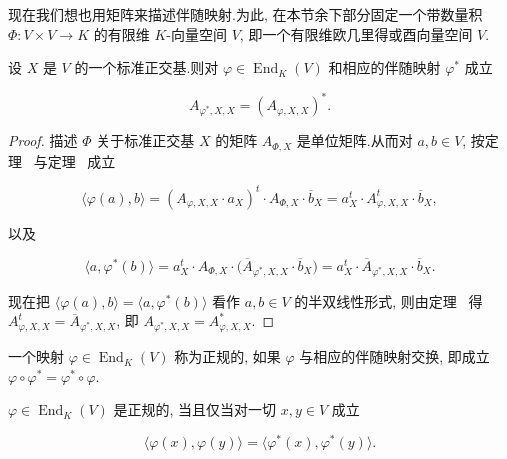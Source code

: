 现在我们想也用矩阵来描述伴随映射.为此, 在本节余下部分固定一个带数量积 $\varPhi \colon V \times V \longrightarrow K$ 的有限维 $K$-向量空间 $V$, 即一个有限维欧几里得或酉向量空间 $V$.

\begin{remark}\label{rem:7.4.4}
设 $X$ 是 $V$ 的一个标准正交基.则对 $\varphi \in \operatorname{End}_K(V)$ 和相应的伴随映射 $\varphi^*$ 成立

\[
A_{\varphi^*, X, X} = (A_{\varphi, X, X})^*\text{.}
\]
\end{remark}

\begin{proof}
描述 $\varPhi$ 关于标准正交基 $X$ 的矩阵 $A_{\varPhi, X}$ 是单位矩阵.从而对 $a, b \in V$, 按定理~ 与定理~ 成立

\[
\bigl\langle \varphi(a), b \bigr\rangle = (A_{\varphi, X, X} \cdot a_X)^t \cdot A_{\varPhi, X} \cdot \overline{b}_X = a_X^t \cdot A_{\varphi, X, X}^t \cdot \overline{b}_X,
\]

以及

\[
\bigl\langle a, \varphi^*(b) \bigr\rangle = a_X^t \cdot A_{\varPhi, X} \cdot \bigl(\overline{A}_{\varphi^*, X, X} \cdot \overline{b}_X\bigr) = a_X^t \cdot \overline{A}_{\varphi^*, X, X} \cdot \overline{b}_X\text{.}
\]

现在把 $\langle \varphi(a), b \rangle = \langle a, \varphi^*(b) \rangle$ 看作 $a, b \in V$ 的半双线性形式, 则由定理~ 得 $A_{\varphi, X, X}^t = \overline{A}_{\varphi^*, X, X}$, 即 $A_{\varphi^*, X, X} = A_{\varphi, X, X}^*$.
\end{proof}

\begin{definition}\label{def:7.4.5}
一个映射 $\varphi \in \operatorname{End}_K(V)$ 称为正规的, 如果 $\varphi$ 与相应的伴随映射交换, 即成立 $\varphi \circ \varphi^* = \varphi^* \circ \varphi$.
\end{definition}

\begin{theorem}\label{thm:7.4.6}
$\varphi \in \operatorname{End}_K(V)$ 是正规的, 当且仅当对一切 $x, y \in V$ 成立

\[
\bigl\langle \varphi(x), \varphi(y) \bigr\rangle = \bigl\langle \varphi^*(x), \varphi^*(y) \bigr\rangle\text{.}
\]
\end{theorem}

